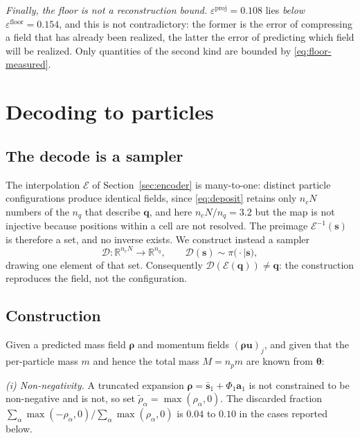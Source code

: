 \documentclass[11pt]{article}
\newcommand{\R}{\mathbb{R}}
\newcommand{\bs}[1]{\boldsymbol{#1}}
\begin{document}
\emph{Finally, the floor is not a reconstruction bound.} $\varepsilon^{\text{proj}} = 0.108$ lies
\emph{below} $\varepsilon^{\text{floor}} = 0.154$, and this is not contradictory: the former is the
error of compressing a field that has already been realized, the latter the error of predicting which
field will be realized. Only quantities of the second kind are bounded by
\eqref{eq:floor-measured}.

\section{Decoding to particles}
\label{sec:decode}

\subsection{The decode is a sampler}

The interpolation $\mathcal{E}$ of Section~\ref{sec:encoder} is many-to-one: distinct particle
configurations produce identical fields, since \eqref{eq:deposit} retains only $n_c N$ numbers of the
$n_q$ that describe $\bs{q}$, and here $n_c N / n_q = 3.2$ but the map is not injective because
positions within a cell are not resolved. The preimage $\mathcal{E}^{-1}(\bs{s})$ is therefore a set,
and no inverse exists. We construct instead a sampler
\begin{equation}
  \mathcal{D} : \R^{n_c N} \to \R^{n_q},
  \qquad
  \mathcal{D}(\bs{s}) \sim \pi\big( \cdot \mid \bs{s} \big),
  \label{eq:decoder}
\end{equation}
drawing one element of that set. Consequently $\mathcal{D}(\mathcal{E}(\bs{q})) \neq \bs{q}$: the
construction reproduces the field, not the configuration.

\subsection{Construction}

Given a predicted mass field $\bs{\rho}$ and momentum fields $(\bs{\rho u})_j$, and given that the
per-particle mass $m$ and hence the total mass $M = n_p m$ are known from $\bs{\theta}$:

\emph{(i) Non-negativity.} A truncated expansion $\bs{\rho} = \bar{\bs{s}}_1 + \Phi_1 \bs{a}_1$ is not
constrained to be non-negative and is not, so set $\tilde{\rho}_\alpha = \max(\rho_\alpha, 0)$. The
discarded fraction $\sum_\alpha \max(-\rho_\alpha,0) / \sum_\alpha \max(\rho_\alpha,0)$ is $0.04$ to
$0.10$ in the cases reported below.
\end{document}
